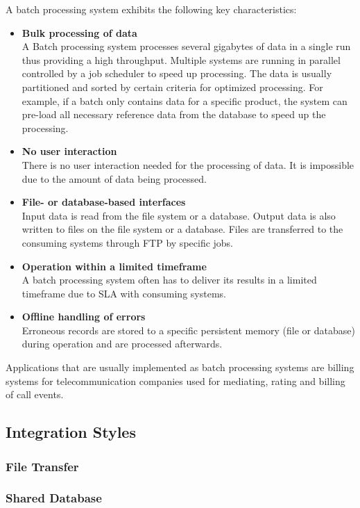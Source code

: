 A batch processing system exhibits the following key characteristics:
\begin{itemize}
	\item \textbf{Bulk processing of data}\\
	A Batch processing system processes several gigabytes of data in a single run thus providing a high throughput. Multiple systems are running in parallel controlled by a job scheduler to speed up processing. The data is usually partitioned and sorted by certain criteria for optimized processing. For example, if a batch only contains data for a specific product, the system can pre-load all necessary reference data from the database to speed up the processing.
	\item \textbf{No user interaction}\\
	There is no user interaction needed for the processing of data. It is impossible due to the amount of data being processed.
	\item \textbf{File- or database-based interfaces}\\
	Input data is read from the file system or a database. Output data is also written to files on the file system or a database. Files are transferred to the consuming systems through FTP by specific jobs.
	\item \textbf{Operation within a limited timeframe}\\
	A batch processing system often has to deliver its results in a limited timeframe due to \ac{SLA} with consuming systems.
	\item \textbf{Offline handling of errors}\\
	Erroneous records are stored to a specific persistent memory (file or database) during operation and are processed afterwards.
\end{itemize}
Applications that are usually implemented as batch processing systems are billing systems for telecommunication companies used for mediating, rating and billing of call events.

\subsection{Integration Styles}

\subsubsection{File Transfer}

\subsubsection{Shared Database}

